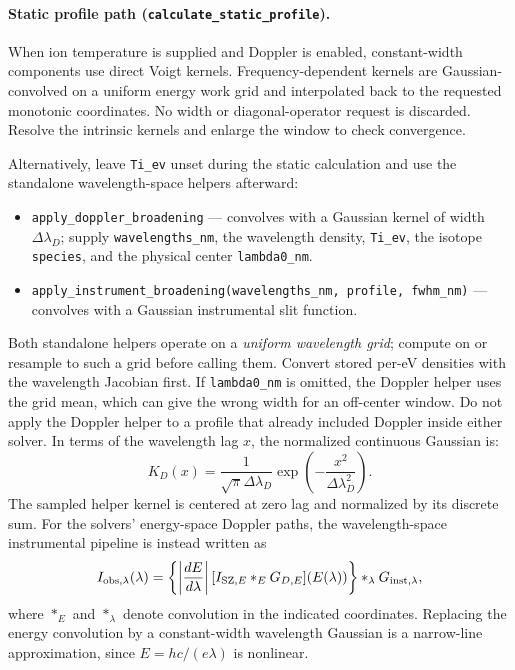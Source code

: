 \documentclass[11pt,a4paper]{article}
\numberwithin{equation}{section}
\begin{document}
\paragraph{Static profile path (\texttt{calculate\_static\_profile}).}
When ion temperature is supplied and Doppler is enabled, constant-width components use direct Voigt kernels. Frequency-dependent kernels are Gaussian-convolved on a uniform energy work grid and interpolated back to the requested monotonic coordinates. No width or diagonal-operator request is discarded. Resolve the intrinsic kernels and enlarge the window to check convergence.

Alternatively, leave \texttt{Ti\_ev} unset during the static calculation and use
the standalone wavelength-space helpers afterward:
\begin{itemize}
    \item \texttt{apply\_doppler\_broadening} — convolves with a Gaussian kernel of width $\Delta\lambda_D$; supply \texttt{wavelengths\_nm}, the wavelength density, \texttt{Ti\_ev}, the isotope \texttt{species}, and the physical center \texttt{lambda0\_nm}.
    \item \texttt{apply\_instrument\_broadening(wavelengths\_nm, profile, fwhm\_nm)} — convolves with a Gaussian instrumental slit function.
\end{itemize}
Both standalone helpers operate on a \emph{uniform wavelength grid}; compute on or
resample to such a grid before calling them. Convert stored per-eV densities
with the wavelength Jacobian first. If \texttt{lambda0\_nm} is omitted, the
Doppler helper uses the grid mean, which can give the wrong width for an
off-center window. Do not apply the Doppler helper to a profile that already
included Doppler inside either solver. In terms of the wavelength lag $x$, the
normalized continuous Gaussian is:
\begin{equation}
K_D(x) = \frac{1}{\sqrt{\pi}\Delta\lambda_D}
         \exp\!\left(-\frac{x^2}{\Delta\lambda_D^2}\right).
\end{equation}
The sampled helper kernel is centered at zero lag and normalized by its
discrete sum. For the solvers' energy-space Doppler paths, the wavelength-space
instrumental pipeline is instead written as
\begin{equation}
I_{{\rm obs},\lambda}(\lambda) =
\left\{\left|\frac{dE}{d\lambda}\right|
  [I_{{\rm SZ},E} *_E G_{D,E}](E(\lambda))\right\}
  *_\lambda G_{{\rm inst},\lambda},
\end{equation}
where $*_E$ and $*_\lambda$ denote convolution in the indicated coordinates.
Replacing the energy convolution by a constant-width wavelength Gaussian is
a narrow-line approximation, since $E=hc/(e\lambda)$ is nonlinear.
\end{document}
